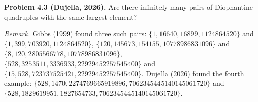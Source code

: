 \textbf{Problem 4.3 (Dujella, 2026).} Are there infinitely many pairs of Diophantine quadruples with the same largest element?

\medskip

\textit{Remark.} Gibbs (1999) found three such pairs: $\{1,16640,16899,1124864520\}$ and $\{1,399,703920,1124864520\}$, $\{120,145673,154155,10778986831096\}$ and $\{8,120,2805566778,10778986831096\}$, $\{528,3253511,3336933,22929452257545400\}$ and $\{15,528,723737525421,22929452257545400\}$. Dujella (2026) found the fourth example: $\{528,1470,2274769665919896,7062345445140145061720\}$ and $\{528,1829619951,1827654733,7062345445140145061720\}$.
